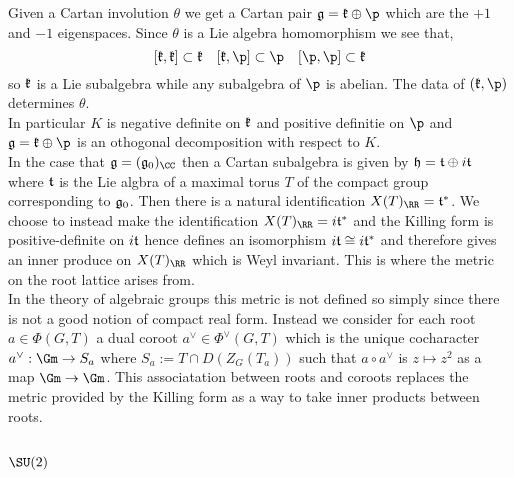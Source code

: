 \documentclass[12pt]{article}
\begin{document}
Given a Cartan involution $\theta$ we get a Cartan pair $\g = \k \oplus \p$ which are the $+1$ and $-1$ eigenspaces. Since $\theta$ is a Lie algebra homomorphism we see that,
\[ [\k, \k] \subset \k \quad [\k, \p] \subset \p \quad [\p, \p] \subset \k \]
so $\mathfrak{k}$ is a Lie subalgebra while any subalgebra of $\p$ is abelian. The data of $(\k, \p)$ determines $\theta$. 
\bigskip\\
In particular $K$ is negative definite on $\mathfrak{k}$ and positive definitie on $\p$ and $\g = \k \oplus \p$ is an othogonal decomposition with respect to $K$. 
\bigskip\\
In the case that $\g = (\g_0)_{\CC}$ then a Cartan subalgebra is given by $\mathfrak{h} = \mathfrak{t} \oplus i \mathfrak{t}$ where $\mathfrak{t}$ is the Lie algbra of a maximal torus $T$ of the compact group corresponding to $\mathfrak{g}_0$. Then there is a natural identification $X(T)_{\RR} = \t^*$. We choose to instead make the identification $X(T)_{\RR} = i \t^*$ and the Killing form is positive-definite on $i \mathfrak{t}$ hence defines an isomorphism $i \mathfrak{t} \cong i \mathfrak{t}^*$ and therefore gives an inner produce on $X(T)_{\RR}$ which is Weyl invariant. This is where the metric on the root lattice arises from. 
\bigskip\\
In the theory of algebraic groups this metric is not defined so simply since there is not a good notion of compact real form. Instead we consider for each root $a \in \Phi(G, T)$ a dual coroot $a^{\vee} \in \Phi^{\vee}(G, T)$ which is the unique cocharacter $a^{\vee} : \Gm \to S_a$ where $S_a := T \cap D(Z_G(T_a))$ such that $a \circ a^\vee$ is $z \mapsto z^2$ as a map $\Gm \to \Gm$. This associatation between roots and coroots replaces the metric provided by the Killing form as a way to take inner products between roots. 


\subsection{$\SU(2)$}

\newcommand{\su}{\mathfrak{su}}
\end{document}
